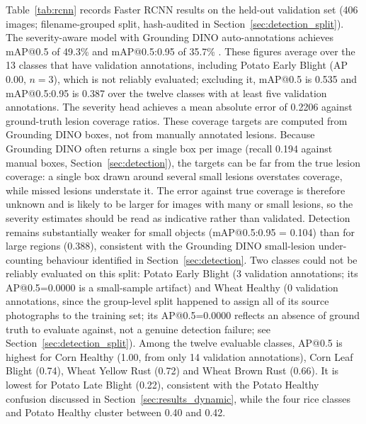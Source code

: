 Table~\ref{tab:rcnn} records Faster RCNN results on the held-out
validation set (406 images; filename-grouped split, hash-audited in Section~\ref{sec:detection_split}).
The severity-aware model with Grounding DINO auto-annotations
achieves mAP@0.5 of 49.3\% and mAP@0.5:0.95 of 35.7\% . These figures average over the 13
classes that have validation annotations, including Potato Early Blight
(AP 0.00, $n=3$), which is not reliably evaluated; excluding it, mAP@0.5
is 0.535 and mAP@0.5:0.95 is 0.387 over the twelve classes with at least
five validation annotations. The severity head achieves a mean absolute
error of 0.2206 against ground-truth lesion coverage ratios.
These coverage targets are computed from Grounding DINO boxes, not from manually annotated lesions. 
Because Grounding DINO often returns a single box per image (recall 0.194 against manual boxes, 
Section~\ref{sec:detection}), the targets can be far from the true lesion coverage: a single box drawn 
around several small lesions overstates coverage, while missed lesions understate it. 
The error against true coverage is therefore unknown and is likely to be larger for images with many 
or small lesions, so the severity estimates should be read as indicative rather than validated.
Detection remains substantially weaker for small objects
(mAP@0.5:0.95 = 0.104) than for large regions (0.388), consistent
with the Grounding DINO small-lesion under-counting behaviour
identified in Section~\ref{sec:detection}.
Two classes could not be reliably evaluated on this split: Potato
Early Blight (3 validation annotations; its AP@0.5=0.0000 is a
small-sample artifact) and Wheat Healthy (0 validation annotations,
since the group-level split happened to assign all of its source
photographs to the training set; its AP@0.5=0.0000 reflects an
absence of ground truth to evaluate against, not a genuine detection
failure; see Section~\ref{sec:detection_split}).
Among the twelve evaluable classes, AP@0.5 is highest for Corn Healthy
(1.00, from only 14 validation annotations), Corn Leaf Blight (0.74),
Wheat Yellow Rust (0.72) and Wheat Brown Rust (0.66). It is lowest for
Potato Late Blight (0.22), consistent with the Potato Healthy confusion
discussed in Section~\ref{sec:results_dynamic}, while the four rice
classes and Potato Healthy cluster between 0.40 and 0.42.

